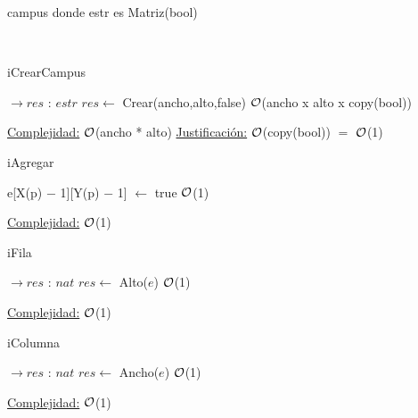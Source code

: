 \begin{Representacion}

	
	\begin{Estructura}{campus}
	donde estr es Matriz(bool)
	\end{Estructura}
	
~	
	
\newpage
\begin{Algoritmos}

	\begin{algorithm}[H]
		\caption{iCrearCampus}		
		\begin{algorithmic}[1]
			 $\to res$ : $estr$
				\State $res \gets$ Crear(ancho,alto,false) \Comment $\mathcal{O}$(ancho x alto x copy(bool))			
			\EndProcedure
		\end{algorithmic}
		\underline{Complejidad:} $\mathcal{O}$(ancho * alto)
		\underline{Justificación:} $\mathcal{O}$(copy(bool)) $=$ $\mathcal{O}$(1)				
	\end{algorithm}
	
	
	\begin{algorithm}[H]
		\caption{iAgregar}
		\begin{algorithmic}[1]
				\State e[X(p) $-$ 1][Y(p) $-$ 1] $\gets$ true \Comment $\mathcal{O}$(1)			
			\EndProcedure
		\end{algorithmic}
		\underline{Complejidad:} $\mathcal{O}$(1)	
	\end{algorithm}	
	
	
	\begin{algorithm}[H]
		\caption{iFila}
		\begin{algorithmic}[1]
			 $\to res$ : $nat$
				\State $res \gets$ Alto($e$)	\Comment $\mathcal{O}$(1)
			\EndProcedure		
		\end{algorithmic}
		\underline{Complejidad:} $\mathcal{O}$(1)
	\end{algorithm}
	
	
	\begin{algorithm}[H]
		\caption{iColumna}
		\begin{algorithmic}[1]
			 $\to res$ : $nat$
				\State $res \gets$ Ancho($e$) \Comment $\mathcal{O}$(1)
			\EndProcedure		
		\end{algorithmic}
		\underline{Complejidad:} $\mathcal{O}$(1)
	\end{algorithm}
	

\end{Algoritmos}
\end{Representacion}
